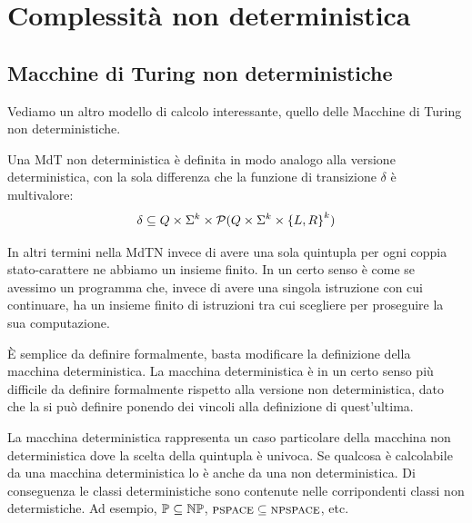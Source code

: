 %
%
%
%
\chapter{Complessità non deterministica}

\section{Macchine di Turing non deterministiche}

Vediamo un altro modello di calcolo interessante, quello delle Macchine di Turing non
deterministiche.

Una MdT non deterministica è definita in modo analogo alla versione deterministica, con la sola
differenza che la funzione di transizione $\delta$ è multivalore:
\begin{equation*}
    \delta \subseteq Q \times \Sigma^{k} \times \mathcal{P}(Q \times \Sigma^{k} \times \left\{L,R\right\}^{k})
\end{equation*}

In altri termini nella MdTN invece di avere una sola quintupla per ogni coppia stato-carattere ne
abbiamo un insieme finito. In un certo senso è come se avessimo un programma che, invece di avere
una singola istruzione con cui continuare, ha un insieme finito di istruzioni tra cui scegliere per
proseguire la sua computazione.

È semplice da definire formalmente, basta modificare la definizione della macchina deterministica.
La macchina deterministica è in un certo senso più difficile da definire formalmente rispetto alla
versione non deterministica, dato che la si può definire ponendo dei vincoli alla definizione di
quest'ultima.

La macchina deterministica rappresenta un caso particolare della macchina non deterministica dove la
scelta della quintupla è univoca. Se qualcosa è calcolabile da una macchina deterministica lo è
anche da una non deterministica. Di conseguenza le classi deterministiche sono contenute nelle
corripondenti classi non determistiche. Ad esempio, $\mathbb{P} \subseteq \mathbb{NP}$, $\textsc{pspace} \subseteq
\textsc{npspace}$, etc.

